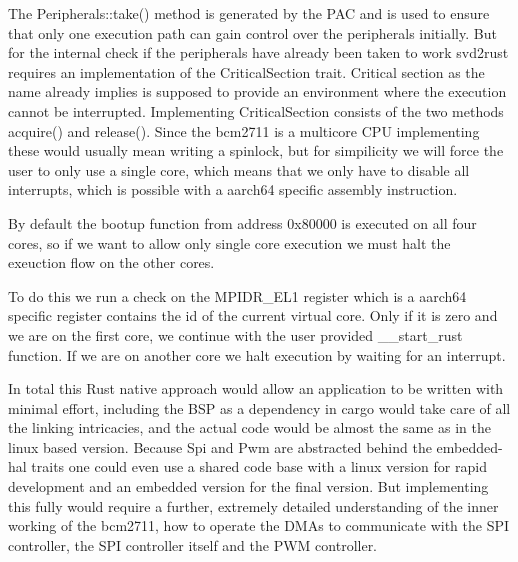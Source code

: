 The Peripherals::take() method is generated by the PAC and is used to ensure that only one execution path can gain control over the peripherals initially.
But for the internal check if the peripherals have already been taken to work svd2rust requires an implementation of the CriticalSection trait.
Critical section as the name already implies is supposed to provide an environment where the execution cannot be interrupted.
Implementing CriticalSection consists of the two methods acquire() and release().
Since the bcm2711 is a multicore CPU implementing these would usually mean writing a spinlock,
but for simpilicity we will force the user to only use a single core, which means that we only have to disable all interrupts,
which is possible with a aarch64 specific assembly instruction.



By default the bootup function from address 0x80000 is executed on all four cores,
so if we want to allow only single core execution we must halt the exeuction flow on the other cores.

To do this we run a check on the MPIDR\_EL1 register which is a aarch64 specific register contains the id of the current virtual core.
Only if it is zero and we are on the first core, we continue with the user provided \_\_start\_rust function.
If we are on another core we halt execution by waiting for an interrupt.



In total this Rust native approach would allow an application to be written with minimal effort,
including the BSP as a dependency in cargo would take care of all the linking intricacies,
and the actual code would be almost the same as in the linux based version.
Because Spi and Pwm are abstracted behind the embedded-hal traits one could even use a shared code base with a linux version for rapid development
and an embedded version for the final version.
But implementing this fully would require a further, extremely detailed understanding of the inner working of the bcm2711,
how to operate the DMAs to communicate with the SPI controller, the SPI controller itself and the PWM controller.
